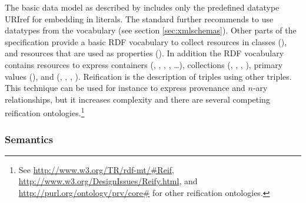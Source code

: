 The basic  data model as described by \textcite{Klyne2004} includes 
only the predefined datatype URIref  for 
embedding  in  literals. The standard further recommends 
to use datatypes from the  vocabulary
(see section \ref{sec:xmlschemas}). Other parts of the  specification
\cite{Manola2004,Hayes2004,Brickley2004} provide a basic RDF vocabulary to
collect resources in classes (), and resources that are used
as properties (). In addition the RDF vocabulary contains
resources to express containers (, , ,
,  \ldots), collections (, 
, , ), primary values 
(), and  (,
, , ). Reification
is the description of  triples using other  triples.
This technique can be used for instance to express provenance and 
$n$-ary relationships, but it increases complexity and there are
several competing reification ontologies.\footnote{See 
\url{http://www.w3.org/TR/rdf-mt/\#Reif}, 
\url{http://www.w3.org/DesignIssues/Reify.html},
and \url{http://purl.org/ontology/prv/core\#} for other reification
ontologies.}

\subsubsection{Semantics}

